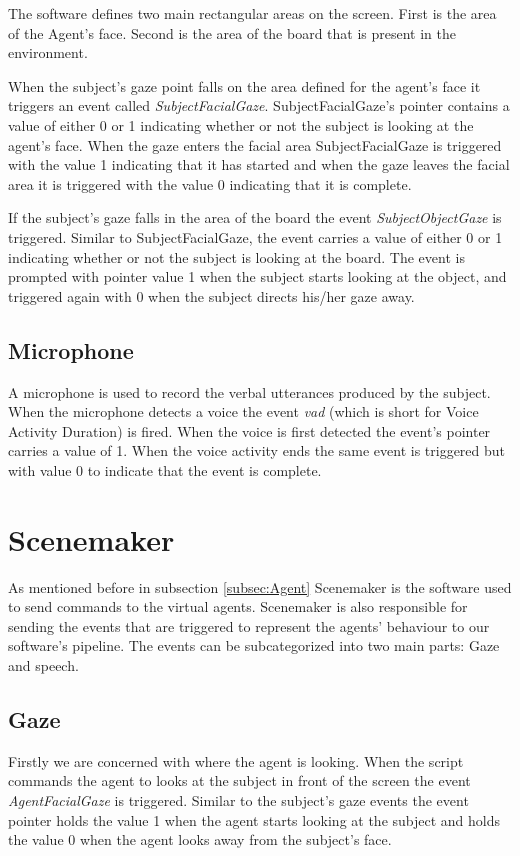 \documentclass[12pt, a4paper, fleqn]{memoir}%
\begin{document}
The software defines two main rectangular areas on the screen. First is the area of the Agent's face. Second is the area of the board that is present in the environment.

When the subject's gaze point falls on the area defined for the agent's face it triggers an event called \textit{SubjectFacialGaze}. SubjectFacialGaze's pointer contains a value of either 0 or 1 indicating whether or not the subject is looking at the agent's face. When the gaze enters the facial area SubjectFacialGaze is triggered with the value 1 indicating that it has started and when the gaze leaves the facial area it is triggered with the value 0 indicating that it is complete.

If the subject's gaze falls in the area of the board the event \textit{SubjectObjectGaze} is triggered. Similar to SubjectFacialGaze, the event carries a value of either 0 or 1 indicating whether or not the subject is looking at the board. The event is prompted with pointer value 1 when the subject starts looking at the object, and triggered again with 0 when the subject directs his/her gaze away.

\subsection{Microphone}
A microphone is used to record the verbal utterances produced by the subject. When the microphone detects a voice the event \textit{vad} (which is short for Voice Activity Duration) is fired. When the voice is first detected the event's pointer carries a value of 1. When the voice activity ends the same event is triggered but with value 0 to indicate that the event is complete.

\section{Scenemaker}
\label{sec:Scenemaker}
As mentioned before in subsection \ref{subsec:Agent} Scenemaker is the software used to send commands to the virtual agents. Scenemaker is also responsible for sending the events that are triggered to represent the agents' behaviour to our software's pipeline. The events can be subcategorized into two main parts: Gaze and speech.

\subsection{Gaze}
Firstly we are concerned with where the agent is looking. When the script commands the agent to looks at the subject in front of the screen the event \textit{AgentFacialGaze} is triggered. Similar to the subject's gaze events the event pointer holds the value 1 when the agent starts looking at the subject and holds the value 0 when the agent looks away from the subject's face.
\end{document}
